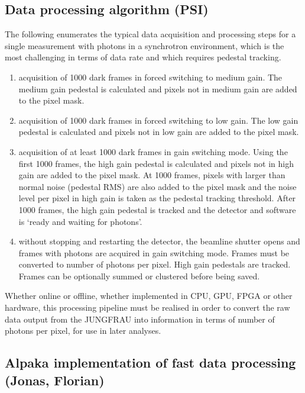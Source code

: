 \documentclass[a4paper]{article}
\begin{document}
\subsection{Data processing algorithm (PSI)}
\label{subsec:alg}
The following enumerates the typical data acquisition and processing steps for a single measurement with photons in a synchrotron environment, which is the most challenging in terms of data rate and which requires pedestal tracking.
\begin{enumerate}
\item acquisition of 1000 dark frames in forced switching to medium gain. The medium gain pedestal is calculated and pixels not in medium gain are added to the pixel mask.
\item acquisition of 1000 dark frames in forced switching to low gain. The low gain pedestal is calculated and pixels not in low gain are added to the pixel mask.
\item acquisition of at least 1000 dark frames in gain switching mode. Using the first 1000 frames, the high gain pedestal is calculated and pixels not in high gain are added to the pixel mask. At 1000 frames, pixels with larger than normal noise (pedestal RMS) are also added to the pixel mask and the noise level per pixel in high gain is taken as the pedestal tracking threshold. After 1000 frames, the high gain pedestal is tracked and the detector and software is `ready and waiting for photons'.
\item without stopping and restarting the detector, the beamline shutter opens and frames with photons are acquired in gain switching mode. Frames must be converted to number of photons per pixel. High gain pedestals are tracked. Frames can be optionally summed or clustered before being saved.
\end{enumerate}
Whether online or offline, whether implemented in CPU, GPU, FPGA or other hardware, this processing pipeline must be realised in order to convert the raw data output from the JUNGFRAU into information in terms of number of photons per pixel, for use in later analyses.


\subsection{Alpaka implementation of fast data processing (Jonas, Florian)}
\label{subsec:alpaka}
\end{document}
